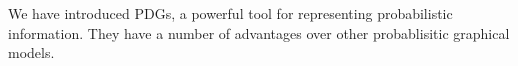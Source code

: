 \documentclass[letterpaper]{article} %
\theoremstyle{plain}
\theoremstyle{definition}
\theoremstyle{remark}
\begin{document}
We have introduced PDGs, a powerful tool for representing
probabilistic information. 
They have a number of advantages over other
probablisitic graphical models. 
\end{document}
